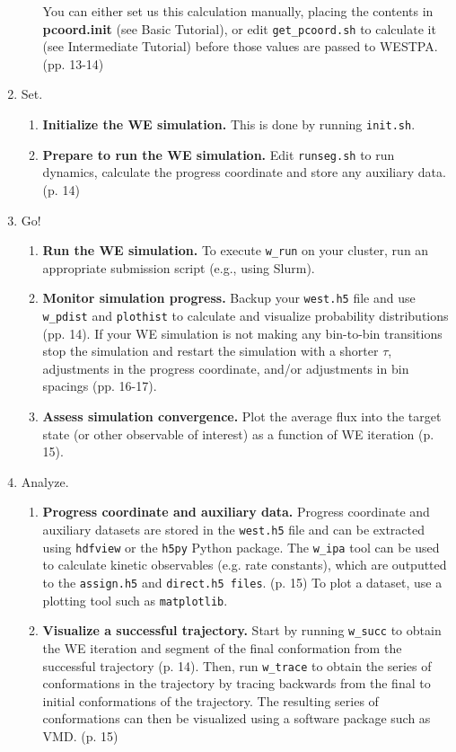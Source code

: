 \documentclass[9pt,tutorial,ASAPversion]{livecoms}
\begin{document}
\begin{enumerate}
\begin{enumerate}
You can either set us this calculation manually, placing the contents in \textbf{pcoord.init} (see Basic Tutorial), or edit \verb|get_pcoord.sh| to calculate it (see Intermediate Tutorial) before those values are passed to WESTPA. (pp. 13-14)
\end{enumerate}
\item Set.
\begin{enumerate}
\item \textbf{Initialize the WE simulation.}  This is done by running \verb|init.sh|.
\item \textbf{Prepare to run the WE simulation.} Edit \verb|runseg.sh| to run dynamics, calculate the progress coordinate and store any auxiliary data. (p. 14)
\end{enumerate}
\item Go!
\begin{enumerate}
\item \textbf{Run the WE simulation.} 
To execute \verb|w_run| on your cluster, run an appropriate submission script (e.g., using Slurm).
\item \textbf{Monitor simulation progress.}
Backup your \verb|west.h5| file and use \verb|w_pdist| and \verb|plothist| to calculate and visualize probability distributions (pp. 14). 
If your WE simulation is not making any bin-to-bin transitions stop the simulation and restart the simulation with a shorter $\tau$, adjustments in the progress coordinate, and/or adjustments in bin spacings (pp. 16-17). 
\item \textbf{Assess simulation convergence.} 
Plot the average flux into the target state (or other observable of interest) as a function of WE iteration (p. 15).
\end{enumerate}
\item Analyze.
\begin{enumerate}
\item \textbf{Progress coordinate and auxiliary data.} 
Progress coordinate and auxiliary datasets are stored in the \verb|west.h5| file and can be extracted using \verb|hdfview| or the \verb|h5py| Python package. 
The \verb|w_ipa| tool can be used to calculate kinetic observables (e.g. rate constants), which are outputted to the \verb|assign.h5| and \verb|direct.h5 files|. (p. 15) 
To plot a dataset, use a plotting tool such as \verb|matplotlib|.
\item \textbf{Visualize a successful trajectory.}
Start by running \verb|w_succ| to obtain the WE iteration and segment of the final conformation from the successful trajectory (p. 14). 
Then, run \verb|w_trace| to obtain the series of conformations in the trajectory by tracing backwards from the final to initial conformations of the trajectory. 
The resulting series of conformations can then be visualized using a software package such as VMD. (p. 15) 
\end{enumerate}
\end{enumerate}
\end{document}
